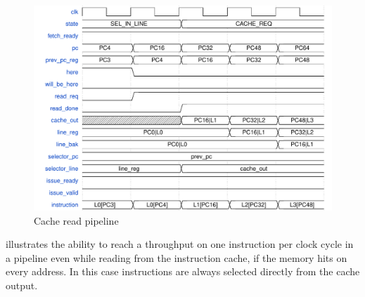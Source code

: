 \begin{figure}[!h]
  \centering
  \includegraphics[scale=.6]{img/fetch07.pdf}
  \caption{Cache read pipeline}
  \label{fig:fetch07}
\end{figure}
 illustrates the ability to reach a throughput on one instruction per clock cycle in a pipeline even while reading from the instruction cache, if the memory hits on every address. In this case instructions are always selected directly from the cache output.

